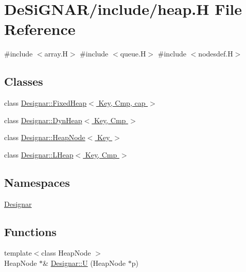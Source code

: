 \hypertarget{heap_8_h}{}\section{De\+Si\+G\+N\+A\+R/include/heap.H File Reference}
\label{heap_8_h}
{\ttfamily \#include $<$array.\+H$>$}\newline
{\ttfamily \#include $<$queue.\+H$>$}\newline
{\ttfamily \#include $<$nodesdef.\+H$>$}\newline
\subsection*{Classes}
\begin{DoxyCompactItemize}
\item 
class \hyperlink{class_designar_1_1_fixed_heap}{Designar\+::\+Fixed\+Heap$<$ Key, Cmp, cap $>$}
\item 
class \hyperlink{class_designar_1_1_dyn_heap}{Designar\+::\+Dyn\+Heap$<$ Key, Cmp $>$}
\item 
class \hyperlink{class_designar_1_1_heap_node}{Designar\+::\+Heap\+Node$<$ Key $>$}
\item 
class \hyperlink{class_designar_1_1_l_heap}{Designar\+::\+L\+Heap$<$ Key, Cmp $>$}
\end{DoxyCompactItemize}
\subsection*{Namespaces}
\begin{DoxyCompactItemize}
\item 
 \hyperlink{namespace_designar}{Designar}
\end{DoxyCompactItemize}
\subsection*{Functions}
\begin{DoxyCompactItemize}
\item 
{\footnotesize template$<$class Heap\+Node $>$ }\\Heap\+Node $\ast$\& \hyperlink{namespace_designar_a67f4b8d103125d6c93110f43f4446187}{Designar\+::U} (Heap\+Node $\ast$p)
\end{DoxyCompactItemize}
